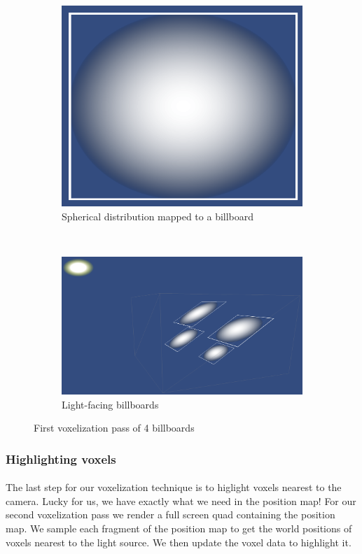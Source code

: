 \begin{figure}[t]
\centering
	\begin{subfigure}[t]{0.48\textwidth}
	\includegraphics[width=\textwidth]{../res/spherebillboard.png}
	\caption{Spherical distribution mapped to a billboard}
	\end{subfigure}
	~
	\begin{subfigure}[t]{0.48\textwidth}
	\includegraphics[width=\textwidth]{../res/lightfacing.png}
	\caption{Light-facing billboards}
	\end{subfigure}
\caption{First voxelization pass of 4 billboards}
\end{figure}

\subsubsection{Highlighting voxels}\paragraph{}
The last step for our voxelization technique is to higlight voxels nearest to the camera. Lucky for us, we have exactly what we need in the position map! 
For our second voxelization pass we render a full screen quad containing the position map. We sample each fragment of the position map to get the world positions of voxels nearest to the light source. We then update the voxel data to highlight it. 

